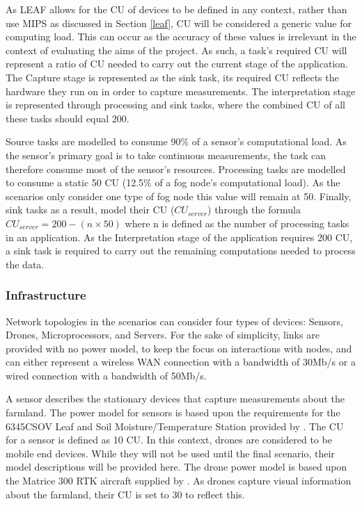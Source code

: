 \documentclass{l4proj}
\begin{document}
As LEAF allows for the CU of devices to be defined in any context, rather than use MIPS as discussed in Section \ref{leaf}, CU will be considered a generic value for computing load.
This can occur as the accuracy of these values is irrelevant in the context of evaluating the aims of the project.
As such, a task's required CU will represent a ratio of CU needed to carry out the current stage of the application.
The Capture stage is represented as the sink task, its required CU reflects the hardware they run on in order to capture measurements.
The interpretation stage is represented through processing and sink tasks, where the combined CU of all these tasks should equal 200.

Source tasks are modelled to consume 90\% of a sensor's computational load.
As the sensor's primary goal is to take continuous measurements, the task can therefore consume most of the sensor's resources.
Processing tasks are modelled to consume a static 50 CU (12.5\% of a fog node's computational load).
As the scenarios only consider one type of fog node this value will remain at 50.
Finally, sink tasks as a result, model their CU ($CU_{server}$) through the formula $CU_{server} = 200 - (n \times 50)$ where n is defined as the number of processing tasks in an application.
As the Interpretation stage of the application requires 200 CU, a sink task is required to carry out the remaining computations needed to process the data.


\subsubsection{Infrastructure}
Network topologies in the scenarios can consider four types of devices: Sensors, Drones, Microprocessors, and Servers.
For the sake of simplicity, links are provided with no power model, to keep the focus on interactions with nodes, and can either represent a wireless WAN connection with a bandwidth of 30Mb/s or a wired connection with a bandwidth of 50Mb/s.

A sensor describes the stationary devices that capture measurements about the farmland.
The power model for sensors is based upon the requirements for the 6345CSOV Leaf and Soil Moisture/Temperature Station provided by \cite{prodataWeatherSystems}.
The CU for a sensor is defined as 10 CU.
In this context, drones are considered to be mobile end devices. While they will not be used until the final scenario, their model descriptions will be provided here.
The drone power model is based upon the Matrice 300 RTK aircraft supplied by \cite{drone_spec}.
As drones capture visual information about the farmland, their CU is set to 30 to reflect this.
\end{document}
